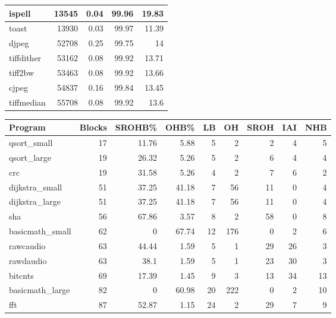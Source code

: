 \begin{tabular}{l|r|r|r|r}
\hline
 ispell          &   13545 &   0.04 &        99.96 &   19.83 \\
\hline
 toast           &   13930 &   0.03 &        99.97 &   11.39 \\
\hline
 djpeg           &   52708 &   0.25 &        99.75 &   14    \\
\hline
 tiffdither      &   53162 &   0.08 &        99.92 &   13.71 \\
\hline
 tiff2bw         &   53463 &   0.08 &        99.92 &   13.66 \\
\hline
 cjpeg           &   54837 &   0.16 &        99.84 &   13.45 \\
\hline
 tiffmedian      &   55708 &   0.08 &        99.92 &   13.6  \\
\hline
\end{tabular}\begin{tabular}{l|r|r|r|r|r|r|rr}
\hline
 Program         &   Blocks &   SROHB\% &   OHB\% &   LB &   OH &   SROH &   IAI &   NHB \\
\hline
 qsort\_small     &       17 &    11.76 &   5.88 &    5 &    2 &      2 &     4 &     5 \\
\hline
 qsort\_large     &       19 &    26.32 &   5.26 &    5 &    2 &      6 &     4 &     4 \\
\hline
 crc             &       19 &    31.58 &   5.26 &    4 &    2 &      7 &     6 &     2 \\
\hline
 dijkstra\_small  &       51 &    37.25 &  41.18 &    7 &   56 &     11 &     0 &     4 \\
\hline
 dijkstra\_large  &       51 &    37.25 &  41.18 &    7 &   56 &     11 &     0 &     4 \\
\hline
 sha             &       56 &    67.86 &   3.57 &    8 &    2 &     58 &     0 &     8 \\
\hline
 basicmath\_small &       62 &     0    &  67.74 &   12 &  176 &      0 &     2 &     6 \\
\hline
 rawcaudio       &       63 &    44.44 &   1.59 &    5 &    1 &     29 &    26 &     3 \\
\hline
 rawdaudio       &       63 &    38.1  &   1.59 &    5 &    1 &     23 &    30 &     3 \\
\hline
 bitcnts         &       69 &    17.39 &   1.45 &    9 &    3 &     13 &    34 &    13 \\
\hline
 basicmath\_large &       82 &     0    &  60.98 &   20 &  222 &      0 &     2 &    10 \\
\hline
 fft             &       87 &    52.87 &   1.15 &   24 &    2 &     29 &     7 &     9 \\

\end{tabular}
